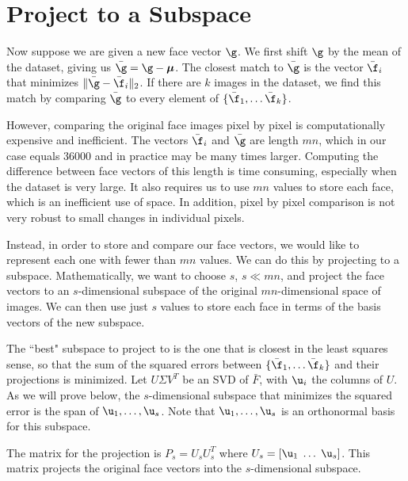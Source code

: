 \section*{Project to a Subspace}
Now suppose we are given a new face vector $\g$. 
We first shift $\g$ by the mean of the dataset, giving us $\bar{\g} = \g - {\boldsymbol \mu}$.
The closest match to $\bar{\g}$ is the vector $\bar{\f}_i$ that minimizes $\|\bar{\g}-\bar{\f}_i\|_2$.
If there are $k$ images in the dataset, we find this match by comparing $\bar{\g}$ to every element of $\{\bar{\f}_1, \ldots \bar{\f}_k\}$.

However, comparing the original face images pixel by pixel is computationally expensive and inefficient.
The vectors $\bar{\f}_i$ and $\bar{\g}$ are length $mn$, which in our case equals 36000 and in practice may be many times larger.
Computing the difference between face vectors of this length is time consuming, especially when the dataset is very large.
It also requires us to use $mn$ values to store each face, which is an inefficient use of space.
In addition, pixel by pixel comparison is not very robust to small changes in individual pixels.

Instead, in order to store and compare our face vectors, we would like to represent each one with fewer than $mn$ values.
We can do this by projecting to a subspace.
Mathematically, we want to choose $s$, $s \ll mn$, and project the face vectors to an $s$-dimensional subspace of the original $mn$-dimensional space of images.
We can then use just $s$ values to store each face in terms of the basis vectors of the new subspace.

The ``best" subspace to project to is the one that is closest in the least squares sense, so that the sum of the squared errors between $\{\bar{\f}_1, \ldots \bar{\f}_k\}$ and their projections is minimized.
Let $U \Sigma V^T$ be an SVD of $\bar{F}$, with $\u_i$ the columns of $U$. 
As we will prove below, the $s$-dimensional subspace that minimizes the squared error is the span of $\u_1, \ldots, \u_s$.
Note that $\u_1, \ldots, \u_s$ is an orthonormal basis for this subspace.

The matrix for the projection is $P_s = U_s U_s^T$ where $U_s = [ \u_1\; \ldots \; \u_s]$. 
This matrix projects the original face vectors into the $s$-dimensional subspace. 


